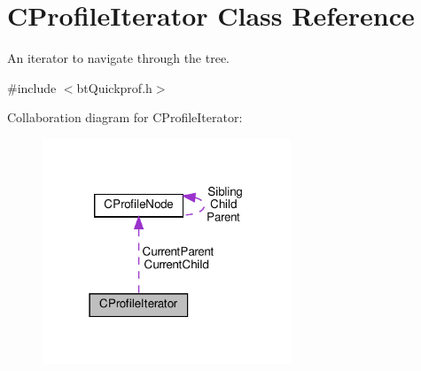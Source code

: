 \hypertarget{classCProfileIterator}{}\section{C\+Profile\+Iterator Class Reference}
\label{classCProfileIterator}


An iterator to navigate through the tree.  




{\ttfamily \#include $<$bt\+Quickprof.\+h$>$}



Collaboration diagram for C\+Profile\+Iterator\+:
\nopagebreak
\begin{figure}[H]
\begin{center}
\leavevmode
\includegraphics[width=210pt]{classCProfileIterator__coll__graph}
\end{center}
\end{figure}

